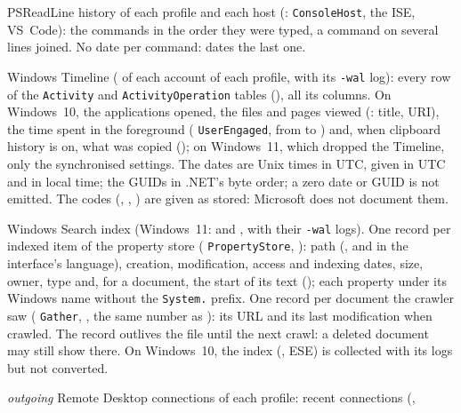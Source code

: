 \documentclass[11pt,a4paper,oneside]{report}
\begin{document}
\begin{description}[style=nextline,leftmargin=1.2em]
  \item[\fichier{powershell\_history.json}] PSReadLine history of each profile
        and each host (: \texttt{ConsoleHost}, the ISE, VS~Code):
        the commands in the order they were typed, a command on several lines
        joined. No date per command:  dates the last one.
  \item[\fichier{activities\_cache.json}] Windows Timeline
        ( of each account of each profile, with
        its \texttt{-wal} log): every row of the \texttt{Activity} and
        \texttt{ActivityOperation} tables (), all its columns.
        On Windows~10, the applications opened, the files and pages viewed
        (: title, URI), the time spent in the foreground
        ( \texttt{UserEngaged}, from  to
        ) and, when clipboard history is on, what was copied
        (); on Windows~11, which dropped the
        Timeline, only the synchronised settings. The dates are Unix times in
        UTC, given in UTC and in local time; the GUIDs in .NET's byte order; a
        zero date or GUID is not emitted. The codes (,
        , ) are given as stored:
        Microsoft does not document them.
  \item[\fichier{search\_index.json}] Windows Search index (Windows~11:
         and , with their
        \texttt{-wal} logs). One record per indexed item of the property store
        ( \texttt{PropertyStore}, ): path
        (, and  in the interface's
        language), creation, modification, access and indexing dates, size,
        owner, type and, for a document, the start of its text
        (); each property under its Windows name
        without the \texttt{System.} prefix. One record per document the
        crawler saw ( \texttt{Gather}, , the
        same number as ): its URL and its last modification when
        crawled. The record outlives the file until the next crawl: a deleted
        document may still show there. On Windows~10, the index
        (, ESE) is collected with its logs but not
        converted.
  \item[\fichier{rdp\_client.json}] \emph{outgoing} Remote Desktop connections of
        each profile: recent connections (,

\end{description}
\end{document}
